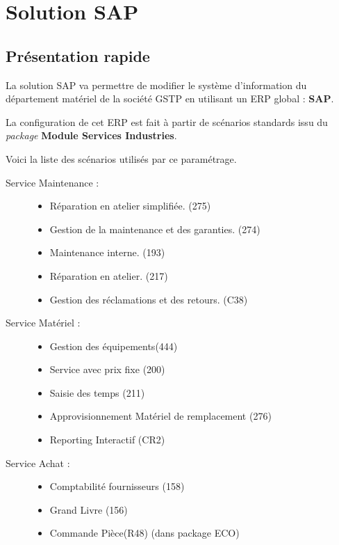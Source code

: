 \section{Solution SAP}

\subsection{Présentation rapide}

La solution SAP va permettre de modifier le système d'information du département
matériel de la société GSTP en utilisant un ERP global : {\bf SAP}.

La configuration de cet ERP est fait à partir de scénarios standards issu du {\sl package}
{\bf Module Services Industries}.

Voici la liste des scénarios utilisés par ce paramétrage.

\begin{description}
\item [Service Maintenance :]\el
\begin{itemize}
    \item Réparation en atelier simplifiée. (275)
    \item Gestion de la maintenance et des garanties. (274)
    \item Maintenance interne. (193)
    \item Réparation en atelier. (217)
    \item Gestion des réclamations et des retours. (C38)
\end{itemize}

\item [Service Matériel :]\el
\begin{itemize}
    \item Gestion des équipements(444)
    \item Service avec prix fixe (200)
    \item Saisie des temps (211)
    \item Approvisionnement Matériel de remplacement (276)
    \item Reporting Interactif (CR2)
\end{itemize}
\item [Service Achat :]\el
\begin{itemize}
    \item Comptabilité fournisseurs (158)
    \item Grand Livre (156)
    \item Commande Pièce(R48) (dans package ECO)
\end{itemize}
\end{description}
